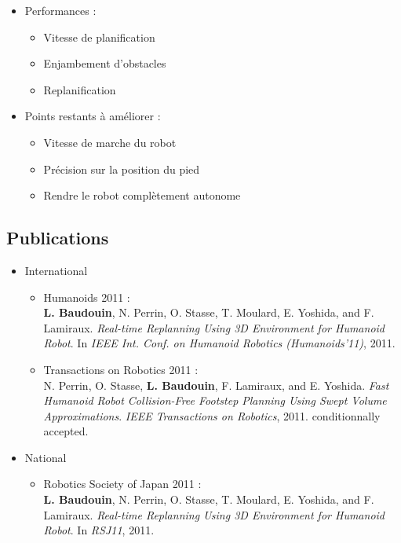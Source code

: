 \documentclass{beamer}
\begin{document}
\begin{frame}
  \begin{itemize}
  \item  Performances :
    \begin{itemize}
    \item Vitesse de planification
    \item Enjambement d'obstacles
    \item Replanification
    \end{itemize}
    \vspace{3mm}
  \item Points restants à améliorer :
    \begin{itemize}
    \item Vitesse de marche du robot
    \item Précision sur la position du pied
    \item Rendre le robot complètement autonome
    \end{itemize}
  \end{itemize}
\end{frame}


\subsection{Publications}
\begin{frame}
\begin{itemize}
\item International
  \begin{itemize}
    \item Humanoids 2011 :\\
\textbf{L. Baudouin}, N. Perrin, O. Stasse, T. Moulard, E. Yoshida, and F. Lamiraux. \emph{Real-time Replanning Using 3D Environment for Humanoid Robot}.
In \textit{IEEE Int. Conf. on Humanoid Robotics (Humanoids’11)}, 2011.

    \item Transactions on Robotics 2011 :\\
N. Perrin, O. Stasse, \textbf{L. Baudouin}, F. Lamiraux, and E. Yoshida. \emph{Fast Humanoid Robot Collision-Free Footstep Planning Using Swept Volume Approximations}. \textit{IEEE Transactions on Robotics}, 2011. conditionnally accepted.
\end{itemize}
\item National
\begin{itemize}
    \item Robotics Society of Japan 2011 :\\
\textbf{L. Baudouin}, N. Perrin, O. Stasse, T. Moulard, E. Yoshida, and F. Lamiraux. \emph{Real-time Replanning Using 3D Environment for Humanoid Robot}.
In \textit{RSJ11}, 2011.
      \end{itemize}
  \end{itemize}
\end{frame}
\end{document}
